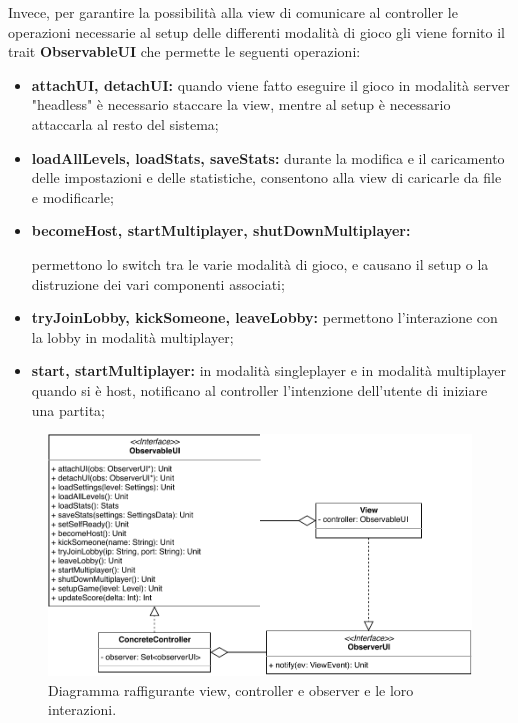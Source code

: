 Invece, per garantire la possibilità alla view di comunicare al controller le operazioni necessarie al setup delle differenti modalità di gioco gli viene fornito il trait \textbf{ObservableUI} che permette le seguenti operazioni:
\begin{itemize}
    \item \textbf{attachUI, detachUI:} quando viene fatto eseguire il gioco in modalità server "headless" è necessario staccare la view, mentre al setup è necessario attaccarla al resto del sistema;
    \item \textbf{loadAllLevels, loadStats, saveStats:} durante la modifica e il caricamento delle impostazioni e delle statistiche, consentono alla view di caricarle da file e modificarle;
    \item \textbf{becomeHost, startMultiplayer, shutDownMultiplayer:}
    
    
    permettono lo switch tra le varie modalità di gioco, e causano il setup o la distruzione dei vari componenti associati;
    \item \textbf{tryJoinLobby, kickSomeone, leaveLobby:} permettono l'interazione con la lobby in modalità multiplayer;
    \item \textbf{start, startMultiplayer:} in modalità singleplayer e in modalità multiplayer quando si è host, notificano al controller l'intenzione dell'utente di iniziare una partita;
\end{itemize}




\begin{figure}[H]
	\centering
	\includegraphics[width=\columnwidth]{drawio/view-controller-observer/view-controller-observer.pdf}
	\caption{Diagramma raffigurante view, controller e observer e le loro interazioni.}
	\label{fig:view-controller-observer}
\end{figure}